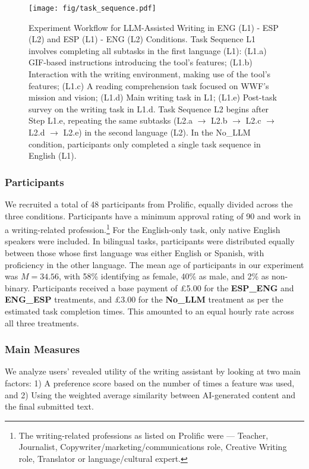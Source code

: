 \begin{figure}[!ht]
\centering
\texttt{[image: fig/task\_sequence.pdf]}
\caption{Experiment Workflow for LLM-Assisted Writing in ENG (L1) - ESP (L2) and ESP (L1) - ENG (L2) Conditions. Task Sequence L1 involves completing all subtasks in the first language (L1): (L1.a) GIF-based instructions introducing the tool’s features; (L1.b) Interaction with the writing environment, making use of the tool’s features; (L1.c) A reading comprehension task focused on WWF’s mission and vision; (L1.d) Main writing task in L1; (L1.e) Post-task survey on the writing task in L1.d. Task Sequence L2 begins after Step L1.e, repeating the same subtasks (L2.a $\rightarrow$ L2.b $\rightarrow$ L2.c $\rightarrow$ L2.d $\rightarrow$ L2.e) in the second language (L2). In the No\_LLM condition, participants only completed a single task sequence in English (L1).}
\label{fig:task_sequence}
\end{figure}





\subsubsection{Participants}
We recruited a total of 48 participants from Prolific, equally divided across the three conditions. Participants have a minimum approval rating of 90 and work in a writing-related profession.\footnote{The writing-related professions as listed on Prolific were --- Teacher, Journalist, Copywriter/marketing/communications role, Creative Writing role, Translator or language/cultural expert.} For the English-only task, only native English speakers were included. In bilingual tasks, participants were distributed equally between those whose first language was either English or Spanish, with proficiency in the other language.
%
The mean age of participants in our experiment was $M = 34.56$, with 58\% identifying as female, 40\% as male, and 2\% as non-binary. Participants received a base payment of £5.00 for the \textbf{ESP\_ENG} and \textbf{ENG\_ESP} treatments, and £3.00 for the \textbf{No\_LLM} treatment as per the estimated task completion times. This amounted to an equal hourly rate across all three treatments.  

\subsubsection{Main Measures}


We analyze users' revealed utility of the writing assistant by looking at two main factors: 1) A preference score based on the number of times a feature was used, and 2) Using the weighted average similarity between AI-generated content and the final submitted text. 

